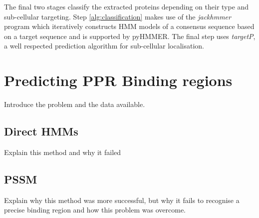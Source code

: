 The final two stages classify the extracted proteins depending on their type
and sub-cellular targeting.
Step \ref{alg:classification} makes use of the \emph{jackhmmer} program which
iteratively constructs HMM models of a consensus sequence based on a target
sequence and is supported by pyHMMER.
The final step uses \emph{targetP}, a well respected prediction algorithm for
sub-cellular localisation\citep{targetP}.

\section{Predicting PPR Binding regions}
\label{sec:ppr_binding_prediction}

Introduce the problem and the data available.

\subsection{Direct HMMs}
\label{sec:hmm_binding}

Explain this method and why it failed

\subsection{PSSM}
\label{sec:pssm_binding}

Explain why this method was more successful, but why it fails to recognise a
precise binding region and how this problem was overcome.


